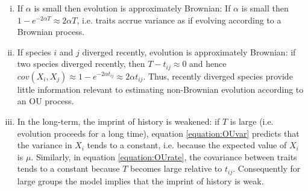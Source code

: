 \documentclass[a4paper,12pt]{article}
\begin{document}
  \begin{enumerate}[(i)]
    \item If $\alpha$ is small then evolution is approximately Brownian: If $\alpha$ is small then $1 - e^{-2\alpha T} \approx 2\alpha T$, i.e. traits accrue variance as if evolving according to a Brownian process.\\ 

    \item If species $i$ and $j$ diverged recently, evolution is approximately Brownian: if two species diverged recently, then $T - t_{ij} \approx 0$ and hence $cov(X_i, X_j) \approx 1 - e^{-2\alpha t_{ij}} \approx 2\alpha t_{ij}$. 
    Thus, recently diverged species provide little information relevant to estimating non-Brownian evolution according to an OU process.\\ 

    \item In the long-term, the imprint of history is weakened: if $T$ is large (i.e. evolution proceeds for a long time), equation \ref{equation:OUvar} predicts that the variance in $X_i$ tends to a constant, i.e. because the expected value of $X_i$ is $\mu$. 
    Similarly, in equation \ref{equation:OUrate}, the covariance between traits tends to a constant because $T$ becomes large relative to $t_{ij}$.
    Consequently for large groups the model implies that the imprint of history is weak.\\
  \end{enumerate}


\end{document}
